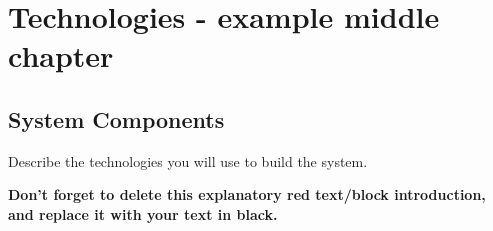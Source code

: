 \chapter{Technologies - example middle chapter} %

\section{System Components} %

\begin{tcolorbox}[      %
    boxrule=0pt,        %
    colback=white,      %
    coltext=red         %
]                       %

    Describe the technologies you will use to build the system.

    \vspace{15pt}       %
    \begin{center}      %
    \textbf{Don't forget to delete this explanatory red text/block introduction, and replace it with your text in black.}
    \end{center}        %
\end{tcolorbox}         %
